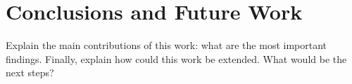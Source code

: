 \section{Conclusions and Future Work} \label{sec:conc}

Explain the main contributions of this work: what are the most important findings. Finally, explain how could this work be extended. What would be the next steps?
